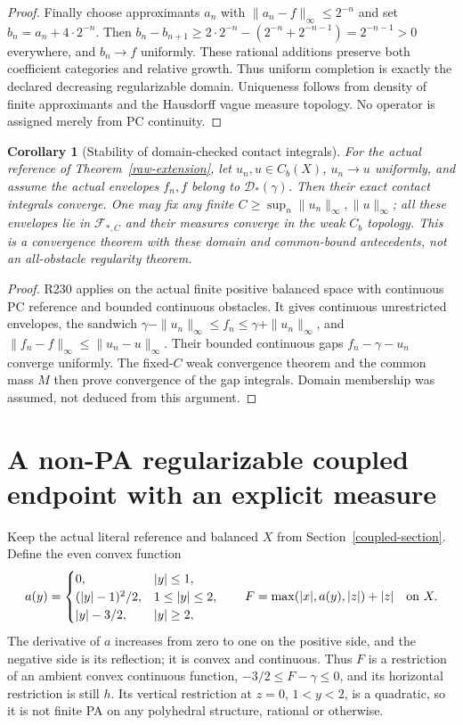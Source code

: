 \documentclass[11pt]{article}
\newtheorem{corollary}[theorem]{Corollary}
\begin{document}
\begin{proof}
Finally choose approximants $a_n$ with $\|a_n-f\|_\infty\leq2^{-n}$
and set $b_n=a_n+4\cdot2^{-n}$. Then
$b_n-b_{n+1}\geq2\cdot2^{-n}-(2^{-n}+2^{-n-1})=2^{-n-1}>0$
everywhere, and $b_n\to f$ uniformly. These rational additions preserve
both coefficient categories and relative growth. Thus uniform completion
is exactly the declared decreasing regularizable domain. Uniqueness
follows from density of finite approximants and the Hausdorff vague
measure topology. No operator is assigned merely from PC continuity.
\end{proof}

\begin{corollary}[Stability of domain-checked contact integrals]\label{contact-stability}
For the actual reference of Theorem~\ref{raw-extension}, let $u_n,u\in C_b(X)$,
$u_n\to u$ uniformly, and assume the actual envelopes $f_n,f$ belong to
$\mathcal D_*(\gamma)$. Then their exact contact integrals converge.
One may fix any finite $C\geq\sup_n\|u_n\|_\infty,\|u\|_\infty$;
all these envelopes lie in $\mathcal F_{*,C}$ and their measures converge
in the weak $C_b$ topology. This is a convergence theorem with these
domain and common-bound antecedents, not an all-obstacle regularity theorem.
\end{corollary}
\begin{proof}
R230 applies on the actual finite positive balanced space with continuous
PC reference and bounded continuous obstacles. It gives continuous
unrestricted envelopes, the sandwich $\gamma-\|u_n\|_\infty\leq f_n
\leq\gamma+\|u_n\|_\infty$, and $\|f_n-f\|_\infty\leq\|u_n-u\|_\infty$.
Their bounded continuous gaps $f_n-\gamma-u_n$ converge uniformly.
The fixed-$C$ weak convergence theorem and the common mass $M$ then
prove convergence of the gap integrals. Domain membership was assumed,
not deduced from this argument.
\end{proof}


\section{A non-PA regularizable coupled endpoint with an explicit measure}\label{nonpa-section}
Keep the actual literal reference and balanced $X$ from
Section~\ref{coupled-section}. Define the even convex function
\[
 a(y)=\begin{cases}
 0,&|y|\leq1,\\
 (|y|-1)^2/2,&1\leq|y|\leq2,\\
 |y|-3/2,&|y|\geq2,
 \end{cases}
 \qquad F=\max(|x|,a(y),|z|)+|z|\quad\hbox{on }X.
\]
The derivative of $a$ increases from zero to one on the positive side,
and the negative side is its reflection; it is convex and continuous.
Thus $F$ is a restriction of an ambient convex continuous function,
$-3/2\leq F-\gamma\leq0$, and its horizontal restriction is still $h$.
Its vertical restriction at $z=0$, $1<y<2$, is a quadratic, so it is
not finite PA on any polyhedral structure, rational or otherwise.
\end{document}
